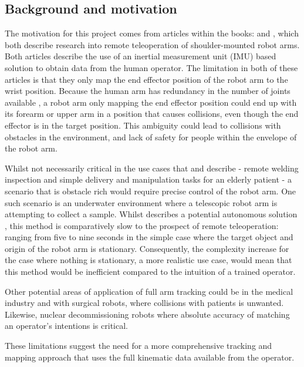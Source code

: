   \subsection{Background and motivation}
  The motivation for this project comes from articles within the books:  \cite{ref:Zhou_Yang_Wang_Dong_2025} and  \cite{ref:Lyu_Yang_Yang_2025}, which both describe research into remote teleoperation of shoulder-mounted robot arms.
  Both articles describe the use of an inertial measurement unit (IMU) based solution to obtain data from the human operator.
  The limitation in both of these articles is that they only map the end effector position of the robot arm to the wrist position.
  Because the human arm has redundancy in the number of joints available \cite{ref:nullspace}, a robot arm only mapping the end effector position could end up with its forearm or upper arm in a position that causes collisions, even though the end effector is in the target position.  
  This ambiguity could lead to collisions with obstacles in the environment, and lack of safety for people within the envelope of the robot arm. 
  
  Whilst not necessarily critical in the use cases that \citeauthor{ref:Zhou_Yang_Wang_Dong_2025} and \citeauthor{ref:Lyu_Yang_Yang_2025} describe - remote welding inspection and simple delivery and manipulation tasks for an elderly patient - a scenario that is obstacle rich would require precise control of the robot arm.
  One such scenario is an underwater environment where a telescopic robot arm is attempting to collect a sample. 
  Whilst \citeauthor{ref:Jin_Ji_Yan_2023} describes a potential autonomous solution \cite{ref:Jin_Ji_Yan_2023}, this method is comparatively slow to the prospect of remote teleoperation: ranging from five to nine seconds in the simple case where the target object and origin of the robot arm is stationary.
  Consequently, the complexity increase for the case where nothing is stationary, a more realistic use case, would mean that this method would be inefficient compared to the intuition of a trained operator. 

  Other potential areas of application of full arm tracking could be in the medical industry and with surgical robots, where collisions with patients is unwanted. 
  Likewise, nuclear decommissioning robots where absolute accuracy of matching an operator's intentions is critical.

  These limitations suggest the need for a more comprehensive tracking and mapping approach that uses the full kinematic data available from the operator.

